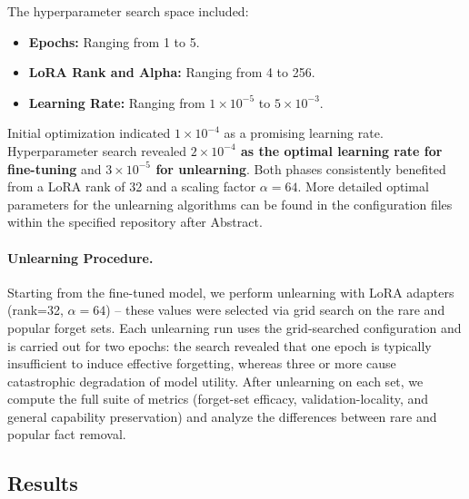 The hyperparameter search space included:
\begin{itemize}
    \item \textbf{Epochs:} Ranging from 1 to 5.
    \item \textbf{LoRA Rank and Alpha:} Ranging from 4 to 256.
    \item \textbf{Learning Rate:} Ranging from $1 \times 10^{-5}$ to $5 \times 10^{-3}$.
\end{itemize}

Initial optimization indicated $1 \times 10^{-4}$ as a promising learning rate. Hyperparameter search revealed \textbf{$2 \times 10^{-4}$ as the optimal learning rate for fine-tuning} and \textbf{$3 \times 10^{-5}$ for unlearning}. Both phases consistently benefited from a LoRA rank of 32 and a scaling factor $\alpha = 64$.
More detailed optimal parameters for the unlearning algorithms can be found in the configuration files within the specified repository after Abstract.


\paragraph{Unlearning Procedure.}
Starting from the fine-tuned model, we perform unlearning with LoRA adapters (rank=32, $\alpha=64$) -- these values were selected via grid search on the rare and popular forget sets. Each unlearning run uses the grid-searched configuration and is carried out for two epochs: the search revealed that one epoch is typically insufficient to induce effective forgetting, whereas three or more cause catastrophic degradation of model utility. After unlearning on each set, we compute the full suite of metrics (forget-set efficacy, validation-locality, and general capability preservation) and analyze the differences between rare and popular fact removal.










\subsection{Results}
\label{sec:exp_res}



